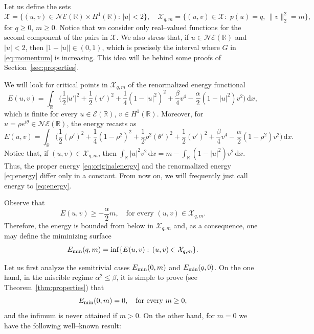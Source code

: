 \documentclass[11pt]{article}
\newcommand{\R}{\mathbb{R}}
\newcommand{\boE}{\mathcal{E}}
\newcommand{\boX}{\mathcal{X}}
\newcommand{\NE}{\mathcal{NE}(\mathbb{R})}
\newcommand{\Emin}{E_\textup{min}}
\renewcommand{\d}{\,\mathrm{d}}
\theoremstyle{plain}
\theoremstyle{definition}
\theoremstyle{remark}
\numberwithin{equation}{section}
\begin{document}
{Let us define the sets
\[\boX=\{(u,v)\in \NE\times H^1(\R):\, |u|< 2\},\quad \boX_{q,m}=\{(u,v)\in \boX:\, \,p(u)=q,\, \|v\|^2_2=m\},\]
for $q\geq 0$, $m\geq 0$. Notice that we consider only real--valued functions for the second component of the pairs in $\boX$. We also stress that, if $u\in\NE$ and $|u|<2$, then $|1-|u||\in (0,1)$, which is precisely the interval where $G$ in \eqref{eq:momentum} is increasing. This idea will be behind some proofs of  Section~\ref{sec:properties}. 

We will look for critical points in $\boX_{q,m}$ of the renormalized energy functional
\begin{equation}\label{eq:energy}
E(u,v)=\int_{\R} \Big(\frac12|u'|^2+\frac12(v')^2+\frac14(1-|u|^2)^2+\frac{\beta}{4}v^4-\frac{\alpha}{2}(1-|u|^2)v^2\Big)\d x,
\end{equation}
which is finite for every $u\in\boE(\R)$, $v\in H^1(\R)$. Moreover, for $u=\rho e^{i\theta}\in\NE$, the energy recasts as
\[E(u,v)=\int_{\R} \Big(\frac12(\rho')^2+\frac14(1-\rho^2)^2+\frac12\rho^2(\theta')^2+\frac12(v')^2+\frac{\beta}{4}v^4-\frac{\alpha}{2}(1-\rho^2)v^2\Big)\d x.\]
Notice that, if $(u,v)\in\boX_{q,m}$, then $\int_\R|u|^2v^2\d x=m-\int_\R(1-|u|^2)v^2\d x$.
Thus, the proper energy \eqref{eq:originalenergy} and the renormalized energy \eqref{eq:energy} differ only in a constant. From now on, we will frequently just call energy to \eqref{eq:energy}.

Observe that 
\[E(u,v)\geq -\frac{\alpha}{2}m,\quad\text{for every }(u,v)\in \boX_{q,m}.\]
Therefore, the energy is bounded from below in $\boX_{q,m}$ and, as a consequence, one may define the miminizing surface
\[\Emin(q,m)=\inf\{E(u,v):\, (u,v)\in \boX_{q,m}\}.\]

Let us first analyze the semitrivial cases $\Emin(0,m)$ and $\Emin(q,0)$. On the one hand, {in the miscible regime $\alpha^2\leq \beta$, it is simple to prove (see Theorem~\ref{thm:properties})} that
\[\Emin(0,m)=0,\quad\text{for every }m\geq 0,\]
and the infimum is never attained if $m>0$. On the other hand, for $m=0$ we have the following well--known result:

}
\end{document}

